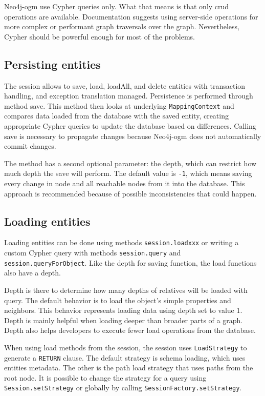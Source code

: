 Neo4j-\acrshort{ogm} use Cypher queries only. What that means is that only \acrfull{crud} operations are available. Documentation
suggests using server-side operations for more complex or performant graph traversals over the graph.
Nevertheless, Cypher should be powerful enough for most of the problems.

\subsection {Persisting entities}

The session allows to save, load, loadAll, and delete entities with transaction handling, and exception translation managed.
Persistence is performed through method save. This method then looks at underlying \texttt{MappingContext} and compares data loaded
from the database with the saved entity, creating appropriate Cypher queries to update the database based on differences.
Calling save is necessary to propagate changes because Neo4j-\acrshort{ogm} does not automatically commit changes.

The method has a second optional parameter: the depth, which can restrict how much depth the save will perform.
The default value is \texttt{-1}, which means saving every change in node and all reachable nodes from it into the database.
This approach is recommended because of possible inconsistencies that could happen.

\subsection {Loading entities}

Loading entities can be done using methods \texttt{session.loadxxx} or writing a custom Cypher query with methods \texttt{session.query} and \texttt{session.queryForObject}.
Like the depth for saving function, the load functions also have a depth.

Depth is there to determine how many depths of relatives will be loaded with query. The default behavior is to load the object's simple properties and neighbors.
This behavior represents loading data using depth set to value 1. Depth is mainly helpful when loading deeper than broader parts of a graph. Depth also helps developers to
execute fewer load operations from the database.

When using load methods from the session, the session uses \texttt{LoadStrategy} to generate a \texttt{RETURN} clause. The default strategy is schema loading,
which uses entities metadata. The other is the path load strategy that uses paths from the root node. It is possible to change the strategy for a query using \texttt{Session.setStrategy}
or globally by calling \texttt{SessionFactory.setStrategy}.

